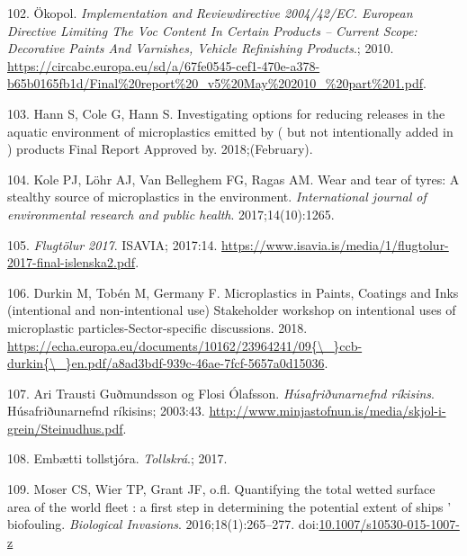 \documentclass[icelandic,]{book}
\begin{document}
\leavevmode\hypertarget{ref-Commission2009}{}%
102. Ökopol. \emph{Implementation and Reviewdirective 2004/42/EC. European Directive Limiting The Voc Content In Certain Products -- Current Scope: Decorative Paints And Varnishes, Vehicle Refinishing Products}.; 2010. \url{https://circabc.europa.eu/sd/a/67fe0545-cef1-470e-a378-b65b0165fb1d/Final\%20report\%20_v5\%20May\%202010_\%20part\%201.pdf}.

\leavevmode\hypertarget{ref-Hann2018}{}%
103. Hann S, Cole G, Hann S. Investigating options for reducing releases in the aquatic environment of microplastics emitted by ( but not intentionally added in ) products Final Report Approved by. 2018;(February).

\leavevmode\hypertarget{ref-kole2017wear}{}%
104. Kole PJ, Löhr AJ, Van Belleghem FG, Ragas AM. Wear and tear of tyres: A stealthy source of microplastics in the environment. \emph{International journal of environmental research and public health}. 2017;14(10):1265.

\leavevmode\hypertarget{ref-isavia2017}{}%
105. \emph{Flugtölur 2017}. ISAVIA; 2017:14. \url{https://www.isavia.is/media/1/flugtolur-2017-final-islenska2.pdf}.

\leavevmode\hypertarget{ref-Durkin2018}{}%
106. Durkin M, Tobén M, Germany F. Microplastics in Paints, Coatings and Inks (intentional and non-intentional use) Stakeholder workshop on intentional uses of microplastic particles-Sector-specific discussions. 2018. \href{https://echa.europa.eu/documents/10162/23964241/09\%7B/_\%7Dccb-durkin\%7B/_\%7Den.pdf/a8ad3bdf-939c-46ae-7fcf-5657a0d15036}{https://echa.europa.eu/documents/10162/23964241/09\{\textbackslash{}\_\}ccb-durkin\{\textbackslash{}\_\}en.pdf/a8ad3bdf-939c-46ae-7fcf-5657a0d15036}.

\leavevmode\hypertarget{ref-Guuxf0mundsson2003}{}%
107. Ari Trausti Guðmundsson og Flosi Ólafsson. \emph{Húsafriðunarnefnd ríkisins}. Húsafriðunarnefnd ríkisins; 2003:43. \url{http://www.minjastofnun.is/media/skjol-i-grein/Steinudhus.pdf}.

\leavevmode\hypertarget{ref-tollur2017}{}%
108. Embætti tollstjóra. \emph{Tollskrá}.; 2017.

\leavevmode\hypertarget{ref-Moser2016}{}%
109. Moser CS, Wier TP, Grant JF, o.fl. Quantifying the total wetted surface area of the world fleet : a first step in determining the potential extent of ships ' biofouling. \emph{Biological Invasions}. 2016;18(1):265--277. doi:\href{https://doi.org/10.1007/s10530-015-1007-z}{10.1007/s10530-015-1007-z}
\end{document}
